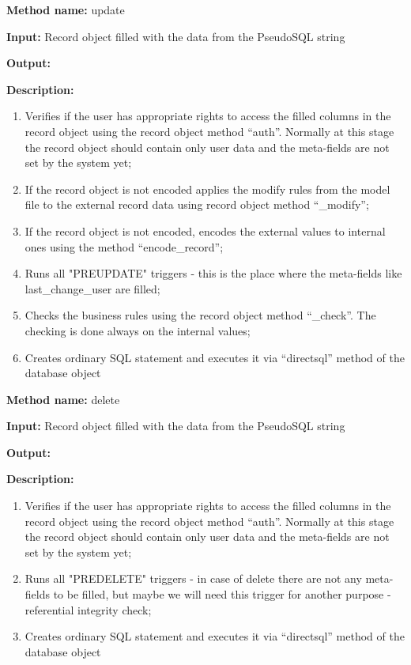 \textbf{Method name:} update 

\textbf{Input:} Record object filled with the data from the PseudoSQL
string 

\textbf{Output:} 

\textbf{Description:} 

\begin{enumerate}
\item Verifies if the user has appropriate rights to access the filled columns
in the record object using the record object method {}``auth''. Normally at this stage the record object should  contain only user data and the meta-fields are not set by the system yet;
\item If the record object is not encoded applies the modify rules from the model file to the external record data using record object method {}``\_modify''; 
\item If the record object is not encoded, encodes the external values to internal ones using the method {}``encode\_record''; 
\item Runs  all "PREUPDATE" triggers - this is the place where the meta-fields like last\_change\_user are filled;
\item Checks the business rules using the record object method {}``\_check''. The checking is done always on the internal values; 
\item Creates ordinary SQL statement and executes it via {}``directsql'' method of the database object
\end{enumerate}

\textbf{Method name:} delete 

\textbf{Input:} Record object filled with the data from the PseudoSQL string

\textbf{Output: }

\textbf{Description:} 

\begin{enumerate}
\item Verifies if the user has appropriate rights to access the filled columns
in the record object using the record object method {}``auth''. Normally at this stage the record object should  contain only user data and the meta-fields are not set by the system yet;
\item Runs  all "PREDELETE" triggers - in case of delete there are not any meta-fields to be filled, but maybe we will need this trigger for another purpose - referential integrity check;
\item Creates ordinary SQL statement and executes it via {}``directsql'' method of the database object
\end{enumerate}


